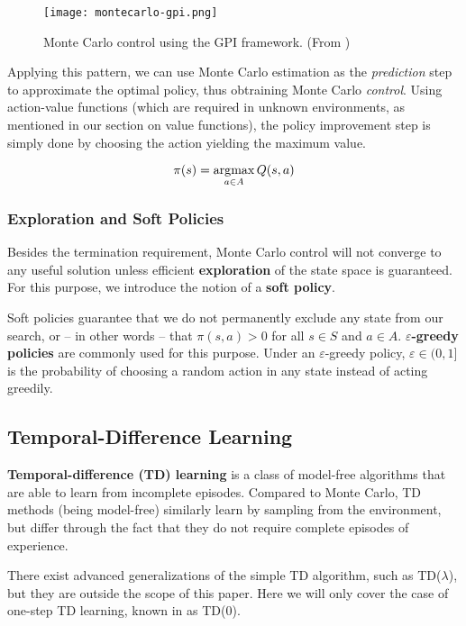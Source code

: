 \begin{figure}[h]
    \texttt{[image: montecarlo-gpi.png]}
    \centering
    \caption{Monte Carlo control using the GPI framework. (From \cite{rlai})}
\end{figure}

Applying this pattern, we can use Monte Carlo estimation as the \emph{prediction} step to approximate the optimal policy, thus obtraining Monte Carlo \emph{control}.
Using action-value functions (which are required in unknown environments, as mentioned in our section on value functions), the policy improvement step is simply done by choosing the action yielding the maximum value.

\begin{equation}
    \pi(s) = \operatorname*{\arg\!\max}_{a \in A}{Q(s, a)}
\end{equation}

\subsubsection{Exploration and Soft Policies}

Besides the termination requirement, Monte Carlo control will not converge to any useful solution unless efficient \textbf{exploration} of the state space is guaranteed.
For this purpose, we introduce the notion of a \textbf{soft policy}.

Soft policies guarantee that we do not permanently exclude any state from our search, or -- in other words -- that $\pi (s, a) > 0$ for all $s \in S$ and $a \in A$.
\textbf{$\varepsilon$-greedy policies} are commonly used for this purpose.
Under an $\varepsilon$-greedy policy, $\varepsilon \in (0, 1]$ is the probability of choosing a random action in any state instead of acting greedily.

\subsection{Temporal-Difference Learning} \label{rl:td}
\textbf{Temporal-difference (TD) learning} is a class of model-free algorithms that are able to learn from incomplete episodes.
Compared to Monte Carlo, TD methods (being model-free) similarly learn by sampling from the environment, but differ through the fact that they do not require complete episodes of experience.

There exist advanced generalizations of the simple TD algorithm, such as TD($\lambda$), but they are outside the scope of this paper.
Here we will only cover the case of one-step TD learning, known in \cite{rlai} as TD(0).

